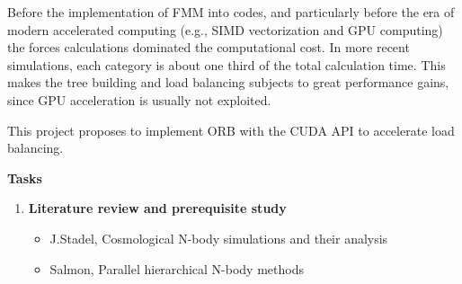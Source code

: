 \documentclass[english]{IFIletter}
\begin{document}
\begin{letter}
Before the implementation of FMM into codes, and particularly before the era of modern accelerated computing (e.g., SIMD vectorization and GPU computing) the forces calculations dominated the computational cost. In more recent simulations, each category is about one third of the total calculation time\cite{2017ComAC...4....2P}. This makes the tree building and load balancing subjects to great performance gains, since GPU acceleration is usually not exploited. 

This project proposes to implement ORB with the CUDA API to accelerate load balancing.

\textbf{Tasks}

\begin{enumerate}\itemsep=15pt

\item \textbf{Literature review and prerequisite study}
  \begin{itemize}
\item J.Stadel, Cosmological N-body simulations and their analysis \cite{stadel:2001}
\item Salmon, Parallel hierarchical N-body methods
\cite{salmon1991parallel}

\end{itemize}


\end{enumerate}
\end{letter}
\end{document}
